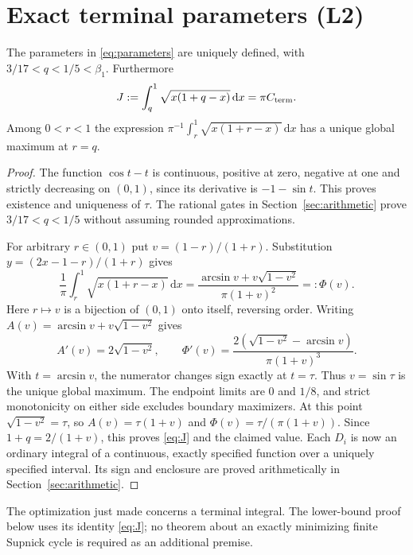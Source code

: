 \documentclass[review,supplement,hidelinks,onefignum,onetabnum]{siamart251216}
\newcommand{\Cterm}{C_{\rm term}}
\newcommand{\dd}{\,\mathrm d}
\begin{document}
\section{Exact terminal parameters (L2)}\label{sec:terminal}
\begin{lemma}\label{lem:terminal}
The parameters in \eqref{eq:parameters} are uniquely defined, with
$3/17<q<1/5<\beta_1$. Furthermore
\begin{equation}\label{eq:J}
J:=\int_q^1\sqrt{x(1+q-x)}\dd x=\pi\Cterm.
\end{equation}
Among $0<r<1$ the expression
$\pi^{-1}\int_r^1\sqrt{x(1+r-x)}\dd x$ has a unique global maximum
at $r=q$.
\end{lemma}
\begin{proof}
The function $\cos t-t$ is continuous, positive at zero, negative at one
and strictly decreasing on $(0,1)$, since its derivative is $-1-\sin t$.
This proves existence and uniqueness of $\tau$. The rational gates in
Section~\ref{sec:arithmetic} prove $3/17<q<1/5$ without assuming rounded
approximations.

For arbitrary $r\in(0,1)$ put $v=(1-r)/(1+r)$. Substitution
$y=(2x-1-r)/(1+r)$ gives
\[
\frac1\pi\int_r^1\sqrt{x(1+r-x)}\dd x
=\frac{\arcsin v+v\sqrt{1-v^2}}{\pi(1+v)^2}=:\Phi(v).
\]
Here $r\mapsto v$ is a bijection of $(0,1)$ onto itself, reversing order.
Writing $A(v)=\arcsin v+v\sqrt{1-v^2}$ gives
\[
A'(v)=2\sqrt{1-v^2},\qquad
\Phi'(v)=\frac{2(\sqrt{1-v^2}-\arcsin v)}{\pi(1+v)^3}.
\]
With $t=\arcsin v$, the numerator changes sign exactly at $t=\tau$.
Thus $v=\sin\tau$ is the unique global maximum. The endpoint limits
are $0$ and $1/8$, and strict monotonicity on either side excludes
boundary maximizers. At this point $\sqrt{1-v^2}=\tau$, so
$A(v)=\tau(1+v)$ and $\Phi(v)=\tau/(\pi(1+v))$.
Since $1+q=2/(1+v)$, this proves \eqref{eq:J} and the claimed value.
Each $D_i$ is now an ordinary integral of a continuous, exactly specified
function over a uniquely specified interval. Its sign and enclosure are
proved arithmetically in Section~\ref{sec:arithmetic}.
\end{proof}
The optimization just made concerns a terminal integral. The lower-bound
proof below uses its identity \eqref{eq:J}; no theorem about an exactly
minimizing finite Supnick cycle is required as an additional premise.
\end{document}
